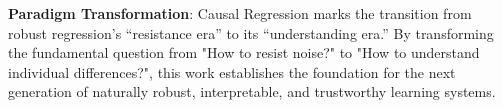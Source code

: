 \documentclass[letterpaper]{article} %
\begin{document}
\textbf{Paradigm Transformation}: Causal Regression marks the transition from robust regression's ``resistance era'' to its ``understanding era.'' By transforming the fundamental question from "How to resist noise?" to "How to understand individual differences?", this work establishes the foundation for the next generation of naturally robust, interpretable, and trustworthy learning systems.


\end{document}
